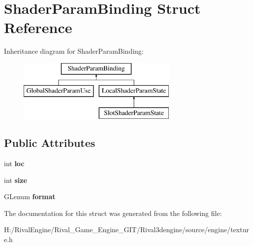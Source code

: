 \hypertarget{struct_shader_param_binding}{}\section{Shader\+Param\+Binding Struct Reference}
\label{struct_shader_param_binding}
Inheritance diagram for Shader\+Param\+Binding\+:\begin{figure}[H]
\begin{center}
\leavevmode
\includegraphics[height=3.000000cm]{struct_shader_param_binding}
\end{center}
\end{figure}
\subsection*{Public Attributes}
\begin{DoxyCompactItemize}
\item 
\mbox{\label{struct_shader_param_binding_a5853f0ff08321c38075fd91a68d2b0b8}} 
int {\bfseries loc}
\item 
\mbox{\label{struct_shader_param_binding_adc02a2b016ff4e35e81362b7c8c638e1}} 
int {\bfseries size}
\item 
\mbox{\label{struct_shader_param_binding_a0492588180aebe5dae2f72b97e63cfef}} 
G\+Lenum {\bfseries format}
\end{DoxyCompactItemize}


The documentation for this struct was generated from the following file\+:\begin{DoxyCompactItemize}
\item 
H\+:/\+Rival\+Engine/\+Rival\+\_\+\+Game\+\_\+\+Engine\+\_\+\+G\+I\+T/\+Rival3dengine/source/engine/texture.\+h\end{DoxyCompactItemize}
